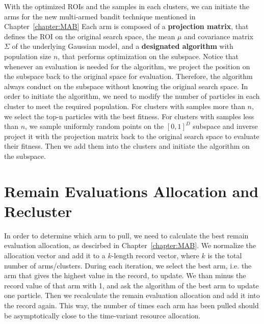 With the optimized ROIs and the samples in each clusters, 
we can initiate the arms for the new multi-armed bandit technique mentioned in Chapter~\ref{chapter:MAB}
Each arm is composed of a \textbf{projection matrix}, that defines the ROI on the original search space,
the mean $\mu$ and covariance matrix $\Sigma$ of the underlying Gaussian model,
and a \textbf{designated algorithm} with population size $n$, that performs optimization on the subspace.
Notice that whenever an evaluation is needed for the algorithm, we project the position on the subspace back to the original space for evaluation.
Therefore, the algorithm always conduct on the subspace without knowing the original search space.
In order to initiate the algorithm, we need to modify the number of particles in each cluster to meet the required population.
For clusters with samples more than $n$, we select the top-n particles with the best fitness.
For clusters with samples less than $n$, we sample uniformly random points on the $[0,1]^D$ subspace and inverse project it with the projection matrix back to the original search space to evaluate their fitness.
Then we add them into the clusters and initiate the algorithm on the subspace.


\section{Remain Evaluations Allocation and Recluster}

In order to determine which arm to pull, we need to calculate the best remain evaluation allocation, as descirbed in Chapter~\ref{chapter:MAB}.
We normalize the allocation vector and add it to a $k$-length record vector, where $k$ is the total number of arms/clusters.  
During each iteration, we select the best arm, i.e. the arm that gives the highest value in the record, to update.
We than minus the record value of that arm with 1, and ask the algorithm of the best arm to update one particle.
Then we recalculate the remain evaluation allocation and add it into the record again.
This way, the number of times each arm has been pulled should be asymptotically close to the time-variant resource allocation.

